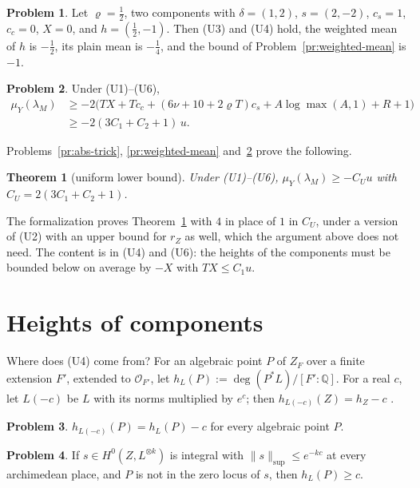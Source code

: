 \documentclass[reqno]{amsart}
\theoremstyle{definition}
\newtheorem{problem}{Problem}[section]
\theoremstyle{plain}
\newtheorem{theorem}{Theorem}[section]
\theoremstyle{remark}
\newcommand{\Q}{\mathbb Q}
\newcommand{\Oc}{\mathcal O}
\begin{document}
\begin{problem}\label{pr:weighted-example}
Let \(\varrho = \frac12\), two components with \(\delta = (1, 2)\), \(s = (2, -2)\), \(c_s = 1\), \(c_c = 0\), \(X = 0\), and \(h = (\frac12, -1)\).  Then (U3) and (U4) hold, the weighted mean of \(h\) is \(-\frac12\), its plain mean is \(-\frac14\), and the bound of Problem~\ref{pr:weighted-mean} is \(-1\).
\end{problem}

\begin{problem}\label{pr:core}
Under (U1)--(U6),
\begin{align*}
  \mu_Y(\lambda_M) &\ge -2\bigl(TX + Tc_c + (6\nu + 10 + 2\varrho T)c_s + A\log\max(A,1) + R + 1\bigr)\\
  &\ge -2(3C_1 + C_2 + 1)\,u .
\end{align*}
\end{problem}

Problems~\ref{pr:abs-trick}, \ref{pr:weighted-mean} and~\ref{pr:core} prove the following.

\begin{theorem}[uniform lower bound]\label{thm:uniform}
Under (U1)--(U6), \(\mu_Y(\lambda_M) \ge -C_Uu\) with \(C_U = 2(3C_1 + C_2 + 1)\).
\end{theorem}

The formalization proves Theorem~\ref{thm:uniform} with \(4\) in place of \(1\) in \(C_U\), under a version of (U2) with an upper bound for \(r_Z\) as well, which the argument above does not need.  The content is in (U4) and (U6): the heights of the components must be bounded below on average by \(-X\) with \(TX \le C_1u\).

\section{Heights of components}\label{sec:heights}

Where does (U4) come from?  For an algebraic point \(P\) of \(Z_F\) over a finite extension \(F'\), extended to \(\Oc_{F'}\), let \(h_L(P) := \deg(P^*L)/[F':\Q]\).  For a real \(c\), let \(L(-c)\) be \(L\) with its norms multiplied by \(e^c\); then \(h_{L(-c)}(Z) = h_Z - c\) \cite{Zha}.

\begin{problem}\label{pr:rescale-height}
\(h_{L(-c)}(P) = h_L(P) - c\) for every algebraic point \(P\).
\end{problem}

\begin{problem}\label{pr:small-section}
If \(s \in H^0(Z, L^{\otimes k})\) is integral with \(\lVert s\rVert_{\sup} \le e^{-kc}\) at every archimedean place, and \(P\) is not in the zero locus of \(s\), then \(h_L(P) \ge c\).
\end{problem}
\end{document}
